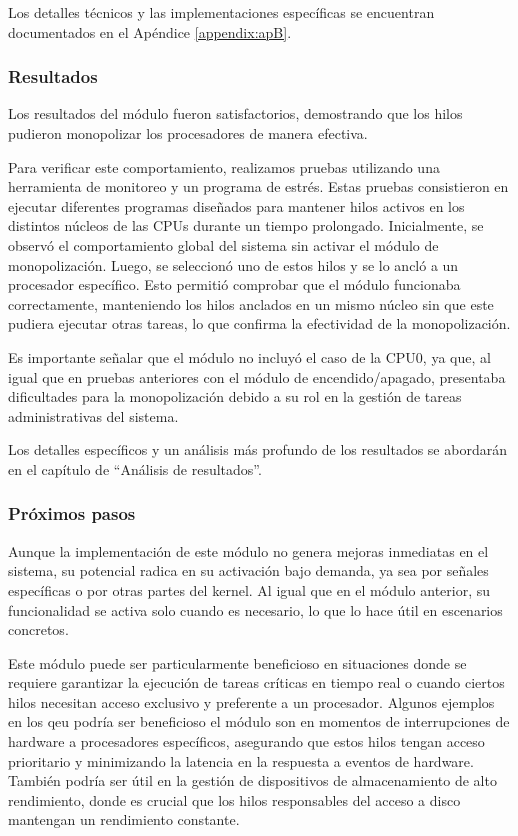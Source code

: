 Los detalles técnicos y las implementaciones específicas se encuentran documentados en el Apéndice \ref{appendix:apB}.

\subsubsection{Resultados}

Los resultados del módulo fueron satisfactorios, demostrando que los hilos pudieron monopolizar los procesadores de manera efectiva.\par

Para verificar este comportamiento, realizamos pruebas utilizando una herramienta de monitoreo y un programa de estrés. Estas pruebas consistieron en ejecutar diferentes programas diseñados para mantener hilos activos en los distintos núcleos de las CPUs durante un tiempo prolongado. Inicialmente, se observó el comportamiento global del sistema sin activar el módulo de monopolización. Luego, se seleccionó uno de estos hilos y se lo ancló a un procesador específico. Esto permitió comprobar que el módulo funcionaba correctamente, manteniendo los hilos anclados en un mismo núcleo sin que este pudiera ejecutar otras tareas, lo que confirma la efectividad de la monopolización.\par

Es importante señalar que el módulo no incluyó el caso de la CPU0, ya que, al igual que en pruebas anteriores con el módulo de encendido/apagado, presentaba dificultades para la monopolización debido a su rol en la gestión de tareas administrativas del sistema.\par

Los detalles específicos y un análisis más profundo de los resultados se abordarán en el capítulo de “Análisis de resultados”.\par

\subsubsection{Próximos pasos}

Aunque la implementación de este módulo no genera mejoras inmediatas en el sistema, su potencial radica en su activación bajo demanda, ya sea por señales específicas o por otras partes del kernel. Al igual que en el módulo anterior, su funcionalidad se activa solo cuando es necesario, lo que lo hace útil en escenarios concretos.

Este módulo puede ser particularmente beneficioso en situaciones donde se requiere garantizar la ejecución de tareas críticas en tiempo real o cuando ciertos hilos necesitan acceso exclusivo y preferente a un procesador. Algunos ejemplos en los qeu podría ser beneficioso el módulo son en momentos de interrupciones de hardware a procesadores específicos, asegurando que estos hilos tengan acceso prioritario y minimizando la latencia en la respuesta a eventos de hardware. También podría ser útil en la gestión de dispositivos de almacenamiento de alto rendimiento, donde es crucial que los hilos responsables del acceso a disco mantengan un rendimiento constante.

